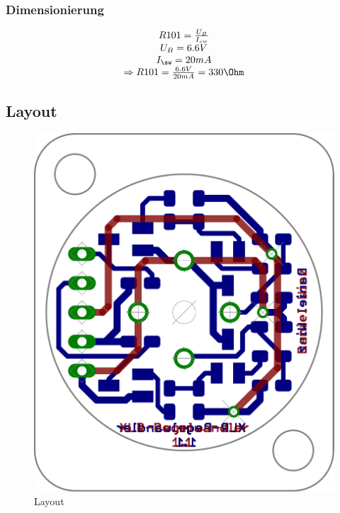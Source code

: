 \subsubsection{Dimensionierung}
\[ \begin{matrix} R101 = \frac{U_B}{I_{sw}}\\
U_B = 6.6 V\\
I_\sw = 20 mA\\
\Rightarrow R101 = \frac{6.6V}{20mA} = 330 \Ohm
\end{matrix} \]

\subsection{Layout}
\begin{figure}[h!]
	\centering
	\includegraphics[scale=\schscale]{fig/xlr_pegelwandler_v_1_1_lay_transp.pdf}
	\caption{Layout}
	\label{lay:pegw}
\end{figure}
